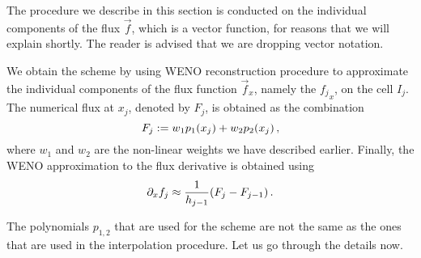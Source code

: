 \documentclass{amsart}
\theoremstyle{definition}
\theoremstyle{remark}
\numberwithin{equation}{section}
\begin{document}
	\begin{Rem} The procedure we describe in this section is conducted on the  individual components of the flux $\vec{f}$, which is a vector function, for reasons that we will explain shortly.  The reader is advised that we are dropping vector notation.
	\end{Rem}
	
We obtain the scheme by using  WENO reconstruction procedure to approximate the individual components of the flux function $\vec{f}_x$, namely the $ {f_j}_x$, on the cell $I_j$.  The numerical flux at $x_{j}$, denoted by
	$F_{j}$, is obtained as the combination
	\begin{equation}\label{eq_f_WENO}
		F_{j}:=w_1p_1\!\left({x_{j}}\right) +w_2p_2\!\left({x_{j}}\right),
	\end{equation}
	where $w_1$ and $w_2$ are the non-linear weights we have described earlier.
	Finally, the WENO approximation to the flux derivative is obtained using
	\begin{equation}\label{eq_WENO_approx_flux_derivative}
		\partial_x f_j\approx \frac{1}{h_{j-1}}\!\left({F_{j}- F_{j-1}}\right).
	\end{equation}
\begin{Rem} The polynomials $p_{1,2}$	that are used for the scheme are not the same as the ones that are used in the interpolation procedure.  Let us go through the details now.
\end{Rem}
	
	
	
	
\end{document}
